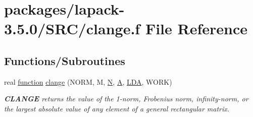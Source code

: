 \hypertarget{clange_8f}{}\section{packages/lapack-\/3.5.0/\+S\+R\+C/clange.f File Reference}
\label{clange_8f}
\subsection*{Functions/\+Subroutines}
\begin{DoxyCompactItemize}
\item 
real \hyperlink{afunc_8m_a7b5e596df91eadea6c537c0825e894a7}{function} \hyperlink{group__complexGEauxiliary_gaa4e1d57c726257bbbfe0c89ef5461c3b}{clange} (N\+O\+R\+M, M, \hyperlink{polmisc_8c_a0240ac851181b84ac374872dc5434ee4}{N}, \hyperlink{classA}{A}, \hyperlink{example__user_8c_ae946da542ce0db94dced19b2ecefd1aa}{L\+D\+A}, W\+O\+R\+K)
\begin{DoxyCompactList}\small\item\em {\bfseries C\+L\+A\+N\+G\+E} returns the value of the 1-\/norm, Frobenius norm, infinity-\/norm, or the largest absolute value of any element of a general rectangular matrix. \end{DoxyCompactList}\end{DoxyCompactItemize}
